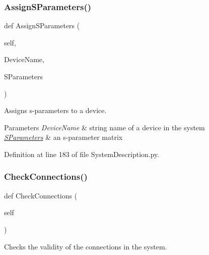 \subsubsection{\texorpdfstring{Assign\+S\+Parameters()}{AssignSParameters()}}
{\footnotesize\ttfamily def Assign\+S\+Parameters (\begin{DoxyParamCaption}\item[{}]{self,  }\item[{}]{Device\+Name,  }\item[{}]{S\+Parameters }\end{DoxyParamCaption})}



Assigns s-\/parameters to a device. 


\begin{DoxyParams}{Parameters}
{\em Device\+Name} & string name of a device in the system \\
\hline
{\em \hyperlink{namespaceSignalIntegrity_1_1SParameters}{S\+Parameters}} & an s-\/parameter matrix \\
\hline
\end{DoxyParams}


Definition at line 183 of file System\+Description.\+py.

\mbox{\label{classSignalIntegrity_1_1SystemDescriptions_1_1SystemDescription_1_1SystemDescription_abc6647e2004523ee8d9b8c2bece038a3}} 
\subsubsection{\texorpdfstring{Check\+Connections()}{CheckConnections()}}
{\footnotesize\ttfamily def Check\+Connections (\begin{DoxyParamCaption}\item[{}]{self }\end{DoxyParamCaption})}



Checks the validity of the connections in the system. 



